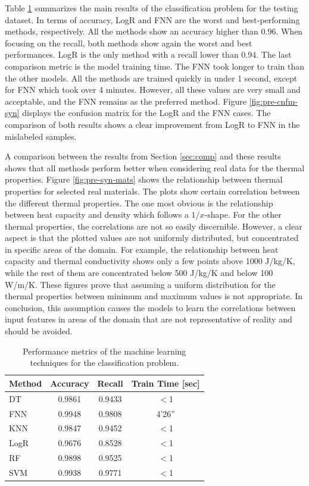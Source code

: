 Table \ref{tab:res-pre-synt} summarizes the main results of the classification problem for the testing dataset.
In terms of accuracy, LogR and FNN are the worst and best-performing methods, respectively.
All the methods show an accuracy higher than 0.96.
When focusing on the recall, both methods show again the worst and best performances.
LogR is the only method with a recall lower than 0.94.
The last comparison metric is the model training time.
The FNN took longer to train than the other models.
All the methods are trained quickly in under 1 second, except for FNN which took over 4 minutes.
However, all these values are very small and acceptable, and the FNN remains as the preferred method.
Figure \ref{fig:pre-cnfm-syn} displays the confusion matrix for the LogR and the FNN cases.
The comparison of both results shows a clear improvement from LogR to FNN in the mislabeled samples.

A comparison between the results from Section \ref{sec:comp} and these results shows that all methods perform better when considering real data for the thermal properties.
Figure \ref{fig:pre-syn-mats} shows the relationship between thermal properties for selected real materials.
The plots show certain correlation between the different thermal properties.
The one most obvious is the relationship between heat capacity and density which follows a $1/x$-shape.
For the other thermal properties, the correlations are not so easily discernible.
However, a clear aspect is that the plotted values are not uniformly distributed, but concentrated in specific areas of the domain.
For example, the relationship between heat capacity and thermal conductivity shows only a few points above 1000 J/kg/K, while the rest of them are concentrated below 500 J/kg/K and below 100 W/m/K.
These figures prove that assuming a uniform distribution for the thermal properties between minimum and maximum values is not appropriate.
In conclusion, this assumption causes the models to learn the correlations between input features in areas of the domain that are not representative of reality and should be avoided.

\begin{table}[htbp!]
  \centering
  \caption{Performance metrics of the machine learning techniques for the classification problem.}
  \label{tab:res-pre-synt}
  \begin{tabular}{lccc}
    \toprule
    Method & Accuracy & Recall & Train Time [sec] \\
    \midrule
    DT      & 0.9861 & 0.9433 &   $<$1 \\
    FNN     & 0.9948 & 0.9808 & 4'26'' \\
    KNN     & 0.9847 & 0.9452 &   $<$1 \\
    LogR    & 0.9676 & 0.8528 &   $<$1 \\
    RF      & 0.9898 & 0.9525 &   $<$1 \\
    SVM     & 0.9938 & 0.9771 &   $<$1 \\
    \bottomrule
  \end{tabular}
\end{table}

